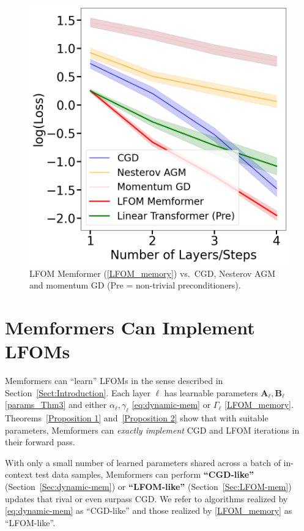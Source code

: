 \documentclass[11pt]{article}
\theoremstyle{plain}
\theoremstyle{definition}
\theoremstyle{remark}
\numberwithin{equation}{section}
\begin{document}
\begin{figure}
  \centering
  \includegraphics[width=0.7\linewidth]{lfom_nonisotropic.png}
  \caption{%
    LFOM Memformer (\ref{LFOM_memory}) vs.\ CGD, Nesterov AGM and momentum GD (Pre = non-trivial preconditioners).
  }
  \label{fig:lfom_nonisotropic}
\end{figure}
\section{Memformers Can Implement LFOMs}
\label{sec:memformers_LFOM}
Memformers can ``learn'' LFOMs in the sense described in Section~\ref{Sect:Introduction}. Each layer \(\ell\) has learnable parameters \(\mathbf{A}_\ell, \mathbf{B}_\ell\) \eqref{params_Thm3} and either \(\alpha_\ell, \gamma_\ell\) \eqref{eq:dynamic-mem} or \(\Gamma_\ell\) \eqref{LFOM_memory}. Theorems~\ref{Proposition 1} and~\ref{Proposition 2} show that with suitable parameters, Memformers can \emph{exactly implement} CGD and LFOM iterations in their forward pass.

With only a small number of learned parameters shared across a batch of in-context test data samples, Memformers can perform \textbf{``CGD-like''} (Section~\ref{Sec:dynamic-mem}) or \textbf{``LFOM-like''} (Section~\ref{Sec:LFOM-mem}) updates that rival or even surpass CGD. We refer to algorithms realized by \eqref{eq:dynamic-mem} as ``CGD-like'' and those realized by \eqref{LFOM_memory} as ``LFOM-like''.
\end{document}
